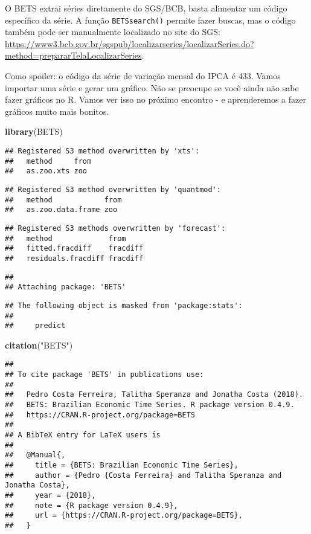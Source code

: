 \documentclass[]{article}
\newenvironment{Shaded}{\begin{snugshade}}{\end{snugshade}}
\newcommand{\KeywordTok}[1]{\textcolor[rgb]{0.13,0.29,0.53}{\textbf{#1}}}
\newcommand{\StringTok}[1]{\textcolor[rgb]{0.31,0.60,0.02}{#1}}
\newcommand{\NormalTok}[1]{#1}
\begin{document}
O BETS extrai séries diretamente do SGS/BCB, basta alimentar um código
específico da série. A função \texttt{BETSsearch()} permite fazer
buscas, mas o código também pode ser manualmente localizado no site do
SGS:
\url{https://www3.bcb.gov.br/sgspub/localizarseries/localizarSeries.do?method=prepararTelaLocalizarSeries}.

Como spoiler: o código da série de variação mensal do IPCA é 433. Vamos
importar uma série e gerar um gráfico. Não se preocupe se você ainda não
sabe fazer gráficos no R. Vamos ver isso no próximo encontro - e
aprenderemos a fazer gráficos muito mais bonitos.

\begin{Shaded}
\begin{Highlighting}[]
\KeywordTok{library}\NormalTok{(BETS)}
\end{Highlighting}
\end{Shaded}

\begin{verbatim}
## Registered S3 method overwritten by 'xts':
##   method     from
##   as.zoo.xts zoo
\end{verbatim}

\begin{verbatim}
## Registered S3 method overwritten by 'quantmod':
##   method            from
##   as.zoo.data.frame zoo
\end{verbatim}

\begin{verbatim}
## Registered S3 methods overwritten by 'forecast':
##   method             from    
##   fitted.fracdiff    fracdiff
##   residuals.fracdiff fracdiff
\end{verbatim}

\begin{verbatim}
## 
## Attaching package: 'BETS'
\end{verbatim}

\begin{verbatim}
## The following object is masked from 'package:stats':
## 
##     predict
\end{verbatim}

\begin{Shaded}
\begin{Highlighting}[]
\KeywordTok{citation}\NormalTok{(}\StringTok{"BETS"}\NormalTok{)}
\end{Highlighting}
\end{Shaded}

\begin{verbatim}
## 
## To cite package 'BETS' in publications use:
## 
##   Pedro Costa Ferreira, Talitha Speranza and Jonatha Costa (2018).
##   BETS: Brazilian Economic Time Series. R package version 0.4.9.
##   https://CRAN.R-project.org/package=BETS
## 
## A BibTeX entry for LaTeX users is
## 
##   @Manual{,
##     title = {BETS: Brazilian Economic Time Series},
##     author = {Pedro {Costa Ferreira} and Talitha Speranza and Jonatha Costa},
##     year = {2018},
##     note = {R package version 0.4.9},
##     url = {https://CRAN.R-project.org/package=BETS},
##   }
\end{verbatim}
\end{document}
